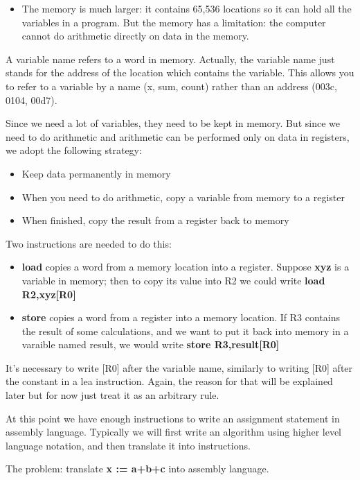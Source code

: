 \documentclass[11pt]{article}
\begin{document}
\begin{itemize}
\begin{itemize}
\item The memory is much larger: it contains 65,536 locations so it can
hold all the variables in a program.  But the memory has a
limitation: the computer cannot do arithmetic directly on data in
the memory.
\end{itemize}

A variable name refers to a word in memory.  Actually, the variable
name just stands for the address of the location which contains the
variable.  This allows you to refer to a variable by a name (x, sum,
count) rather than an address (003c, 0104, 00d7).

Since we need a lot of variables, they need to be kept in memory.  But
since we need to do arithmetic and arithmetic can be performed only on
data in registers, we adopt the following strategy:

\begin{itemize}
\item Keep data permanently in memory
\item When you need to do arithmetic, copy a variable from memory to a
register
\item When finished, copy the result from a register back to memory
\end{itemize}

Two instructions are needed to do this:
\begin{itemize}
\item \textbf{load} copies a word from a memory location into a register.
Suppose \textbf{xyz} is a variable in memory; then to copy its value into
R2 we could write \textbf{load R2,xyz[R0]}
\item \textbf{store} copies a word from a register into a memory location.  If R3
contains the result of some calculations, and we want to put it back
into memory in a varaible named result, we would write \textbf{store
R3,result[R0]}
\end{itemize}

It's necessary to write [R0] after the variable name, similarly to
writing [R0] after the constant in a lea instruction.  Again, the
reason for that will be explained later but for now just treat it as
an arbitrary rule.

At this point we have enough instructions to write an assignment
statement in assembly language.  Typically we will first write an
algorithm using higher level language notation, and then translate it
into instructions.

The problem: translate \textbf{x := a+b+c} into assembly language.


\end{itemize}
\end{document}
